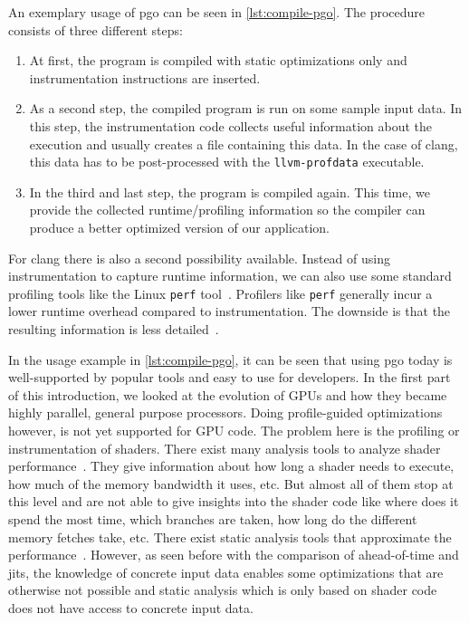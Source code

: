 

An exemplary usage of \gls{pgo} can be seen in \cref{lst:compile-pgo}. The procedure consists of three different steps:
\begin{enumerate}
	\item At first, the program is compiled with static optimizations only and instrumentation instructions are inserted.
	\item As a second step, the compiled program is run on some sample input data. In this step, the instrumentation code collects useful information about the execution and usually creates a file containing this data. In the case of clang, this data has to be post-processed with the \texttt{llvm-profdata} executable.
	\item In the third and last step, the program is compiled again. This time, we provide the collected runtime/profiling information so the compiler can produce a better optimized version of our application.
\end{enumerate}

For clang there is also a second possibility available. Instead of using instrumentation to capture runtime information, we can also use some standard profiling tools like the Linux \texttt{perf} tool~\cite{LinuxPerf}. Profilers like \texttt{perf} generally incur a lower runtime overhead compared to instrumentation. The downside is that the resulting information is less detailed~\cite{ClangManual}.

In the usage example in \cref{lst:compile-pgo}, it can be seen that using \gls{pgo} today is well-supported by popular tools and easy to use for developers. In the first part of this introduction, we looked at the evolution of GPUs and how they became highly parallel, general purpose processors. Doing profile-guided optimizations however, is not yet supported for GPU code. The problem here is the profiling or instrumentation of shaders. There exist many analysis tools to analyze shader performance~\cite{RenderDoc, NvidiaShaderPerf}. They give information about how long a shader needs to execute, how much of the memory bandwidth it uses, etc. But almost all of them stop at this level and are not able to give insights into the shader code like where does it spend the most time, which branches are taken, how long do the different memory fetches take, etc. There exist static analysis tools that approximate the performance~\cite{AMDShaderAnalyzer}. However, as seen before with the comparison of ahead-of-time and \glspl{jit}, the knowledge of concrete input data enables some optimizations that are otherwise not possible and static analysis which is only based on shader code does not have access to concrete input data.

